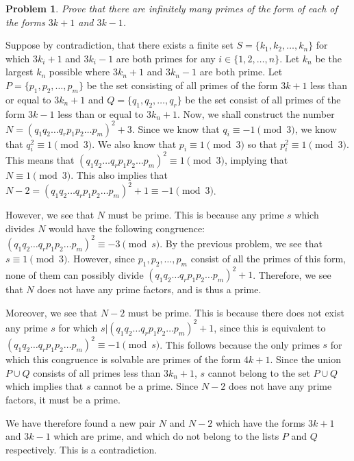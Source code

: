 \documentclass[psamsfonts]{amsart}
\newtheorem{prob}{Problem}[section]
\newenvironment{sol}{{\bfseries Solution}}{\qedsymbol}
\theoremstyle{definition}
\theoremstyle{remark}
\numberwithin{equation}{section}
\begin{document}
\begin{prob}
Prove that there are infinitely many primes of the form of each of the forms $3k+1$ and $3k - 1$. 
\end{prob}

\begin{sol}
Suppose by contradiction, that there exists a finite set $S = \{k_1, k_2, \ldots, k_n\}$ for which $3k_i+1$ and $3k_i-1$ are both primes for any $i \in \{1,2,\ldots, n\}$. Let $k_n$ be the largest $k_n$ possible where $3k_n + 1$ and $3k_n - 1$ are both prime. Let $P = \{p_1, p_2, \ldots, p_m \}$ be the set consisting of all primes of the form $3k+1$ less than or equal to $3k_n + 1$ and $Q = \{q_1, q_2, \ldots, q_r\}$ be the set consist of all primes of the form $3k -1$ less than or equal to $3k_n + 1$. Now, we shall construct the number $N = (q_1 q_2 \ldots q_r p_1 p_2 \ldots p_m)^2 + 3$. Since we know that $q_i \equiv -1 \pmod{3}$, we know that $q_i^2 \equiv 1 \pmod{3}$. We also know that $p_i \equiv 1 \pmod{3}$ so that $p_i^2 \equiv 1 \pmod{3}$. This means that $(q_1 q_2 \ldots q_r p_1 p_2 \ldots p_m)^2 \equiv 1 \pmod{3}$, implying that $N \equiv 1 \pmod{3}$. This also implies that $N - 2 = (q_1 q_2 \ldots q_r p_1 p_2 \ldots p_m)^2 + 1 \equiv -1 \pmod{3}$. 

However, we see that $N$ must be prime. This is because any prime $s$ which divides $N$ would have the following congruence: $(q_1 q_2 \ldots q_r p_1 p_2 \ldots p_m)^2 \equiv -3 \pmod{s}$. By the previous problem, we see that $s \equiv 1 \pmod{3}$. However, since $p_1, p_2, \ldots, p_m$ consist of all the primes of this form, none of them can possibly divide $(q_1 q_2 \ldots q_r p_1 p_2 \ldots p_m)^2 + 1$. Therefore, we see that $N$ does not have any prime factors, and is thus a prime. 

Moreover, we see that $N - 2$ must be prime. This is because there does not exist any prime $s$ for which $s | (q_1 q_2 \ldots q_r p_1 p_2 \ldots p_m)^2 + 1$, since this is equivalent to $(q_1 q_2 \ldots q_r p_1 p_2 \ldots p_m)^2 \equiv -1 \pmod{s}$. This follows because the only primes $s$ for which this congruence is solvable are primes of the form $4k + 1$. Since the union $P \cup Q$ consists of all primes less than $3k_n + 1$, $s$ cannot belong to the set $P \cup Q$ which implies that $s$ cannot be a prime. Since $N-2$ does not have any prime factors, it must be a prime. 

We have therefore found a new pair $N$ and $N-2$ which have the forms $3k + 1$ and $3k-1$ which are prime, and which do not belong to the lists $P$ and $Q$ respectively. This is a contradiction.
\end{sol}
\end{document}
